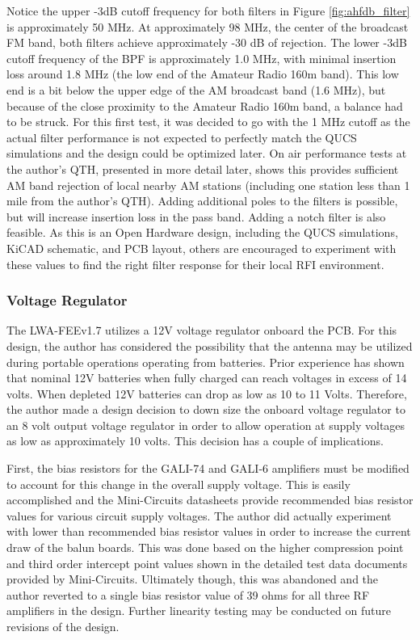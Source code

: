 Notice the upper -3dB cutoff frequency for both filters in Figure \ref{fig:ahfdb_filter} is approximately 50 MHz.
At approximately 98 MHz, the center of the broadcast FM band, both filters achieve approximately -30 dB of rejection.
The lower -3dB cutoff frequency of the BPF is approximately 1.0 MHz, with minimal insertion loss around 1.8 MHz (the low end of the Amateur Radio 160m band).
This low end is a bit below the upper edge of the AM broadcast band (1.6 MHz), but because of the close proximity to the Amateur Radio 160m band, a balance had to be struck.
For this first test, it was decided to go with the 1 MHz cutoff as the actual filter performance is not expected to perfectly match the QUCS simulations and the design could be optimized later.
On air performance tests at the author's QTH, presented in more detail later, shows this provides sufficient AM band rejection of local nearby AM stations (including one station less than 1 mile from the author's QTH).
Adding additional poles to the filters is possible, but will increase insertion loss in the pass band.
Adding a notch filter is also feasible.
As this is an Open Hardware design, including the QUCS simulations, KiCAD schematic, and PCB layout, others are encouraged to experiment with these values to find the right filter response for their local RFI environment.

\subsubsection{Voltage Regulator}
\label{subsubsec:technical:deviation:vreg}
The LWA-FEEv1.7 utilizes a 12V voltage regulator onboard the PCB.
For this design, the author has considered the possibility that the antenna may be utilized during portable operations operating from batteries.
Prior experience has shown that nominal 12V batteries when fully charged can reach voltages in excess of 14 volts.
When depleted 12V batteries can drop as low as 10 to 11 Volts.
Therefore, the author made a design decision to down size the onboard voltage regulator to an 8 volt output voltage regulator in order to allow operation at supply voltages as low as approximately 10 volts.
This decision has a couple of implications.

First, the bias resistors for the GALI-74 and GALI-6 amplifiers must be modified to account for this change in the overall supply voltage.
This is easily accomplished and the Mini-Circuits datasheets provide recommended bias resistor values for various circuit supply voltages.
The author did actually experiment with lower than recommended bias resistor values in order to increase the current draw of the balun boards.
This was done based on the higher compression point and third order intercept point values shown in the detailed test data documents provided by Mini-Circuits.
Ultimately though, this was abandoned and the author reverted to a single bias resistor value of 39 ohms for all three RF amplifiers in the design.
Further linearity testing may be conducted on future revisions of the design.


